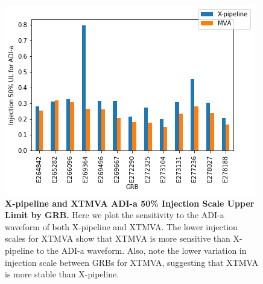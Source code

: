 \documentclass[11pt]{cuthesis}
\newcommand{\xp}{X-pipeline }
\newcommand{\xpfs}{X-pipeline. }
\begin{document}
\begin{figure} %
\begin{center}
\includegraphics[width=1.0\linewidth]{adi_injscale_comparison.png}
\end{center}
\caption{\textbf{\xp and XTMVA  ADI-a 50\% Injection Scale Upper Limit by GRB.} Here we plot the sensitivity to the ADI-a waveform of both \xp and XTMVA. The lower injection scales for XTMVA show that XTMVA is more sensitive than \xp to the ADI-a waveform. Also, note the lower variation in injection scale between GRBs for XTMVA, suggesting that XTMVA is more stable than \xpfs }
\label{fig:adi comparison}
\end{figure}
\end{document}

